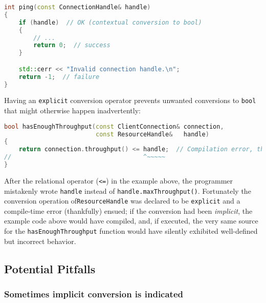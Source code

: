 \begin{lstlisting}[language=C++]
int ping(const ConnectionHandle& handle)
{
    if (handle)  // OK (contextual conversion to bool)
    {
        // ...
        return 0;  // success
    }

    std::cerr << "Invalid connection handle.\n";
    return -1;  // failure
}
\end{lstlisting}

\noindent Having an \texttt{explicit} conversion operator prevents unwanted
conversions to \texttt{bool} that might otherwise happen inadvertently:

\begin{lstlisting}[language=C++]
bool hasEnoughThroughput(const ClientConnection& connection,
                         const ResourceHandle&   handle)
{
    return connection.throughput() <= handle;  // Compilation error, thankfully
//                                    ^~~~~~
}
\end{lstlisting}

\noindent After the relational operator (\texttt{<=}) in the example above, the
programmer mistakenly wrote \texttt{handle} instead of
\mbox{\texttt{handle.maxThroughput()}}. Fortunately the conversion operation of\linebreak[4] %
\mbox{\texttt{ResourceHandle}} was declared to be \texttt{explicit} and a
compile-time error (thankfully) ensued; if the conversion had
been \emph{implicit}, the example code above would have compiled, and,
if executed, the very same source for the \mbox{\texttt{hasEnoughThroughput}}
function would have silently exhibited well-defined but incorrect
behavior.

\subsection[Potential Pitfalls]{Potential Pitfalls}\label{potential-pitfalls-explicitconv}

\subsubsection[Sometimes implicit conversion is indicated]{Sometimes implicit conversion is indicated}\label{sometimes-implicit-conversion-is-indicated}


